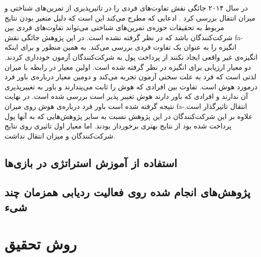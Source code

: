 \documentclass[twoside, a4paper,11pt]{book}
\numberwithin{equation}{chapter}
\numberwithin{table}{chapter}
\numberwithin{figure}{chapter}
\numberwithin{equation}{chapter}
\newcommand{\mls}[1]{\gls{fa-#1}\glsuseri{la-#1}}
\begin{document}
در سال ۲۰۱۴ جائگی نقش تفاوت‌های فردی را در تاثیرپذیری از تمرین‌های شناختی و میزان انتقال بررسی کرد \cite{jaeggi2013IndiDiff}. ادعایی که مطرح می‌کند این است که دلیل متغیر بودن نتایج مربوط به تحقیقات حوزه‌ی تمرین‌های شناختی می‌تواند تفاوت‌های فردی بین شرکت‌کنندگان باشد که در نظر گرفته نشده است. در این پژوهش جائگی نقش \mls{انگیزه} را به عنوان یک تفاوت فردی بررسی می‌کند. به همین منظور و برای اینکه انگیزه‌ی غیر واقعی ایجاد نکنند از پرداخت پول به شرکت‌کنندگان آزمون خودداری کردند. دو معیار ارزیابی برای انگیزه در نظر گرفته شده است. اولین معیار در رابطه با میزان لذتی است که فرد به علت سختی آزمون تجربه می‌کند و دومین معیار درباره‌ی باور فرد درمورد هوش است. تفاوت بین افرادی که هوش را ثابت می‌پندارند و باور به تغییرپذیری آن ندارند و افرادی که باور دارند هوش تغییر پذیر است بررسی شده است. در نهایت نتیجه گرفته شده است باور فرد درباره‌ی هوش روی میزان \mls{انتقال} تاثیرگذار است. علاوه بر این شرکت‌کنندگان در این پژوهش نسبت به سایر پژوهش‌هایی که به آنها پول پرداخت شده بود از نتایج بهتری برخوردار بودند. اما معیار اول تاثیری روی نتایج شرکت‌کنندگان و میزان انتقال نداشت.

\section{استفاده از آموزش استراتژی در بازی‌ها}

\section{پژوهش‌های انجام شده روی فعالیت ردیابی همزمان چند شیء}


\chapter{روش تحقیق}
\label{chapter:methodology}
\thispagestyle{plain}
\end{document}
